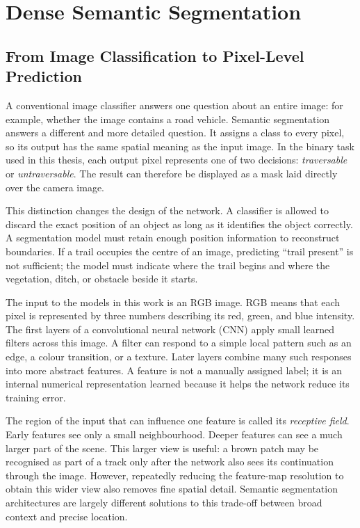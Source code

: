 \section{Dense Semantic Segmentation}

\subsection{From Image Classification to Pixel-Level Prediction}

A conventional image classifier answers one question about an entire image:
for example, whether the image contains a road vehicle. Semantic segmentation
answers a different and more detailed question. It assigns a class to every
pixel, so its output has the same spatial meaning as the input image. In the
binary task used in this thesis, each output pixel represents one of two
decisions: \emph{traversable} or \emph{untraversable}. The result can therefore
be displayed as a mask laid directly over the camera image.

This distinction changes the design of the network. A classifier is allowed to
discard the exact position of an object as long as it identifies the object
correctly. A segmentation model must retain enough position information to
reconstruct boundaries. If a trail occupies the centre of an image, predicting
``trail present'' is not sufficient; the model must indicate where the trail
begins and where the vegetation, ditch, or obstacle beside it starts.

The input to the models in this work is an RGB image. RGB means that each pixel
is represented by three numbers describing its red, green, and blue intensity.
The first layers of a convolutional neural network (CNN) apply small learned
filters across this image. A filter can respond to a simple local pattern such
as an edge, a colour transition, or a texture. Later layers combine many such
responses into more abstract features. A feature is not a manually assigned
label; it is an internal numerical representation learned because it helps the
network reduce its training error.

The region of the input that can influence one feature is called its
\emph{receptive field}. Early features see only a small neighbourhood. Deeper
features can see a much larger part of the scene. This larger view is useful:
a brown patch may be recognised as part of a track only after the network also
sees its continuation through the image. However, repeatedly reducing the
feature-map resolution to obtain this wider view also removes fine spatial
detail. Semantic segmentation architectures are largely different solutions
to this trade-off between broad context and precise location.

